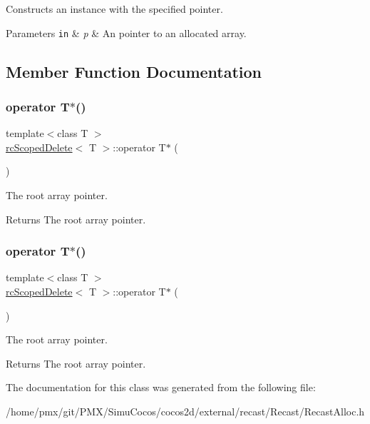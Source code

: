 Constructs an instance with the specified pointer. 
\begin{DoxyParams}[1]{Parameters}
\mbox{\tt in}  & {\em p} & An pointer to an allocated array. \\
\hline
\end{DoxyParams}


\subsection{Member Function Documentation}
\mbox{\label{classrcScopedDelete_a842c6cc65c3811faead9717aa53166dd}} 
\subsubsection{\texorpdfstring{operator T$\ast$()}{operator T*()}\hspace{0.1cm}{\footnotesize\ttfamily [1/2]}}
{\footnotesize\ttfamily template$<$class T $>$ \\
\hyperlink{classrcScopedDelete}{rc\+Scoped\+Delete}$<$ T $>$\+::operator T$\ast$ (\begin{DoxyParamCaption}{ }\end{DoxyParamCaption})\hspace{0.3cm}{\ttfamily [inline]}}

The root array pointer. \begin{DoxyReturn}{Returns}
The root array pointer. 
\end{DoxyReturn}
\mbox{\label{classrcScopedDelete_a842c6cc65c3811faead9717aa53166dd}} 
\subsubsection{\texorpdfstring{operator T$\ast$()}{operator T*()}\hspace{0.1cm}{\footnotesize\ttfamily [2/2]}}
{\footnotesize\ttfamily template$<$class T $>$ \\
\hyperlink{classrcScopedDelete}{rc\+Scoped\+Delete}$<$ T $>$\+::operator T$\ast$ (\begin{DoxyParamCaption}{ }\end{DoxyParamCaption})\hspace{0.3cm}{\ttfamily [inline]}}

The root array pointer. \begin{DoxyReturn}{Returns}
The root array pointer. 
\end{DoxyReturn}


The documentation for this class was generated from the following file\+:\begin{DoxyCompactItemize}
\item 
/home/pmx/git/\+P\+M\+X/\+Simu\+Cocos/cocos2d/external/recast/\+Recast/Recast\+Alloc.\+h\end{DoxyCompactItemize}
